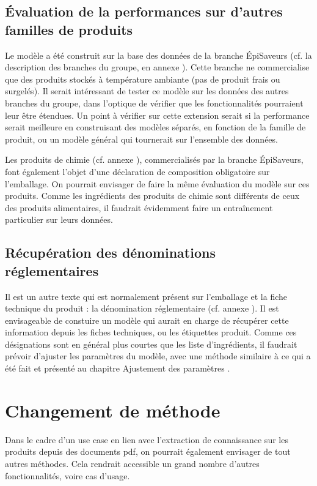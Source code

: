     \subsection{\'{E}valuation de la performances sur d'autres familles de produits}
    Le modèle a été construit sur la base des données de la branche \'{E}piSaveurs (cf. la description des branches du groupe, en annexe ).
    Cette branche ne commercialise que des produits stockés à température ambiante (pas de produit frais ou surgelés).
    Il serait intéressant de tester ce modèle sur les données des autres branches du groupe, dans l'optique de vérifier que les fonctionnalités pourraient leur être étendues.
    Un point à vérifier sur cette extension serait si la performance serait meilleure en construisant des modèles séparés, en fonction de la famille de produit, ou un modèle général qui tournerait sur l'ensemble des données.

    Les produits de chimie (cf. annexe ), commercialisés par la branche \'{E}piSaveurs, font également l'objet d'une déclaration de composition obligatoire sur l'emballage.
    On pourrait envisager de faire la même évaluation du modèle sur ces produits.
    Comme les \og ingrédients \fg des produits de chimie sont différents de ceux des produits alimentaires, il faudrait évidemment faire un entraînement particulier sur leurs données.

    \subsection{Récupération des dénominations réglementaires}

    Il est un autre texte qui est normalement présent sur l'emballage et la fiche technique du produit : la dénomination réglementaire (cf. annexe ).
    Il est envisageable de constuire un modèle qui aurait en charge de récupérer cette information depuis les fiches techniques, ou les étiquettes produit.
    Comme ces désignations sont en général plus courtes que les liste d'ingrédients, il faudrait prévoir d'ajuster les paramètres du modèle, avec une méthode similaire à ce qui a été fait et présenté au chapitre \og Ajustement des paramètres \fg {}.

    \section{Changement de méthode}

    Dans le cadre d'un use case en lien avec l'extraction de connaissance sur les produits depuis des documents pdf, on pourrait également envisager de tout autres méthodes.
    Cela rendrait accessible un grand nombre d'autres fonctionnalités, voire cas d'usage.

